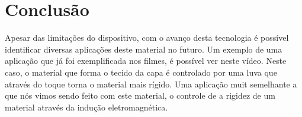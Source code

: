 \section{Conclusão}
Apesar das limitações do dispositivo, com o avanço desta tecnologia é possível identificar diversas aplicações deste material no futuro. Um exemplo de uma aplicação que já foi exemplificada nos filmes, é possível ver neste vídeo. Neste caso, o material que forma o tecido da capa é controlado por uma luva que através do toque torna o material mais rígido. Uma aplicação muit semelhante a que nós vimos sendo feito com este material, o controle de a rigidez de um material através da indução eletromagnética.